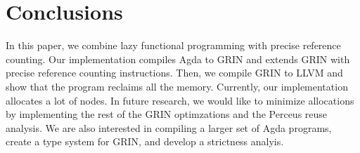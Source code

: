 \documentclass[9pt, twocolumn]{article}
\begin{document}


\section{Conclusions}
In this paper, we combine lazy functional programming with precise reference counting.
Our implementation compiles Agda to GRIN and extends GRIN with precise reference counting instructions. 
Then, we compile GRIN to LLVM and show that the program reclaims all the memory.
Currently, our implementation allocates a lot of nodes. 
In future research, we would like to minimize allocations by implementing the rest of the GRIN optimzations and the Perceus reuse analysis.
We are also interested in compiling a larger set of Agda programs, create a type system for GRIN, and develop a strictness analyis.
\end{document}

